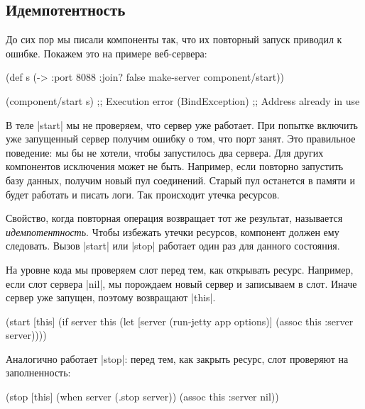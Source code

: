 \subsection{Идемпотентность}

До сих пор мы писали компоненты так, что их повторный запуск приводил к
ошибке. Покажем это на примере веб-сервера:

\begin{english}
  \begin{clojure}
(def s (-> {:port 8088 :join? false}
           make-server
           component/start))

(component/start s)
;; Execution error (BindException)
;; Address already in use
  \end{clojure}
\end{english}

В теле \spverb|start| мы не проверяем, что сервер уже работает. При попытке
включить уже запущенный сервер получим ошибку о том, что порт занят. Это
правильное поведение: мы бы не хотели, чтобы запустилось два сервера. Для других
компонентов исключения может не быть. Например, если повторно запустить базу
данных, получим новый пул соединений. Старый пул останется в памяти и будет
работать и писать логи. Так происходит утечка ресурсов.

Свойство, когда повторная операция возвращает тот же результат, называется
\emph{идемпотентность}. Чтобы избежать утечки ресурсов, компонент должен ему
следовать. Вызов \spverb|start| или \spverb|stop| работает один раз для данного
состояния.

На уровне кода мы проверяем слот перед тем, как открывать ресурс. Например, если
слот сервера \spverb|nil|, мы порождаем новый сервер и записываем в слот. Иначе
сервер уже запущен, поэтому возвращают \spverb|this|.

\begin{english}
  \begin{clojure}
(start [this]
  (if server
    this
    (let [server (run-jetty app options)]
      (assoc this :server server))))
  \end{clojure}
\end{english}

Аналогично работает \spverb|stop|: перед тем, как закрыть ресурс, слот проверяют
на заполненность:

\begin{english}
  \begin{clojure}
(stop [this]
  (when server
    (.stop server))
  (assoc this :server nil))
  \end{clojure}
\end{english}

